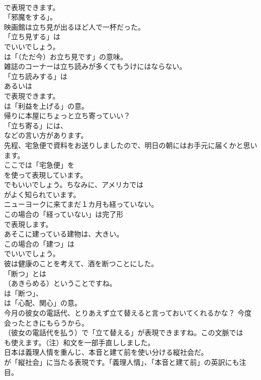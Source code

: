 \documentclass[8pt]{extreport}
\begin{document}
\begin{CJK}{UTF8}{min}
\\	で表現できます。
\\	「邪魔をする」。	
\\	映画館は立ち見が出るほど人で一杯だった。 
\\	「立ち見する」は
\\	でいいでしょう。
\\	は「（ただ今）お立ち見です」の意味。	
\\	雑誌のコーナーは立ち読みが多くてもうけにはならない。 
\\	「立ち読みする」は
\\	あるいは
\\	で表現できます。
\\	は「利益を上げる」の意。	
\\	帰りに本屋にちょっと立ち寄っていい？ 
\\	「立ち寄る」には、
\\	などの言い方があります。	
\\	先程、宅急便で資料をお送りしましたので、明日の朝にはお手元に届くかと思います。 
\\	ここでは「宅急便」を
\\	を使って表現しています。
\\	でもいいでしょう。ちなみに、アメリカでは
\\	がよく知られています。	
\\	ニューヨークに来てまだ１カ月も経っていない。 
\\	この場合の「経っていない」は完了形 
\\	で表現します。	
\\	あそこに建っている建物は、大きい。 
\\	この場合の「建つ」は
\\	でいいでしょう。	
\\	彼は健康のことを考えて、酒を断つことにした。 
\\	「断つ」とは 
\\	（あきらめる）ということですね。
\\	は「断つ」、
\\	は「心配、関心」の意。	
\\	今月の彼女の電話代、とりあえず立て替えると言っておいてくれるかな？ 今度会ったときにもらうから。 
\\	（彼女の電話代を払う）で「立て替える」が表現できますね。この文脈では 
\\	も使えます。（注）和文を一部手直ししました。	
\\	日本は義理人情を重んじ、本音と建て前を使い分ける縦社会だ。 
\\	が「縦社会」に当たる表現です。「義理人情」、「本音と建て前」の英訳にも注目。	

\end{CJK}
\end{document}
